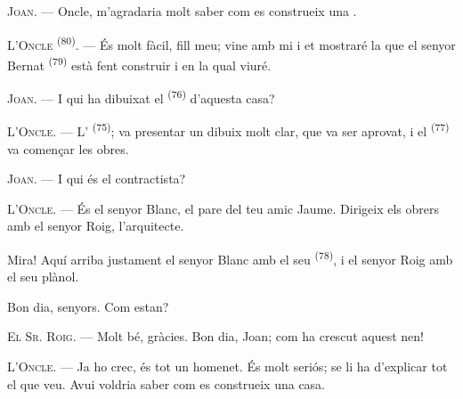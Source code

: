 %
%

\VUsaut{6.0mm}
\VUsaut{1.4mm}
\VUsaut{2.2mm}

\VUsaut{3.0mm}

\textsc{Joan}. --- Oncle, m'agradaria molt saber com es construeix una
.

\textsc{L'Oncle} \textsuperscript{(80)}. --- És molt fàcil, fill meu; vine amb mi i et
mostraré la que el senyor Bernat \textsuperscript{(79)} està fent construir i en la qual
viuré.

\textsc{Joan}. --- I qui ha dibuixat el  \textsuperscript{(76)} d'aquesta casa?

\textsc{L'Oncle}. --- L' \textsuperscript{(75)}; va presentar un dibuix
molt clar, que va ser aprovat, i el  \textsuperscript{(77)} va començar
les obres.

\textsc{Joan}. --- I qui és el contractista?

\textsc{L'Oncle}. --- És el senyor Blanc, el pare del teu amic Jaume. Dirigeix els obrers amb
el senyor Roig, l'arquitecte.

Mira! Aquí arriba justament el senyor Blanc amb el seu  \textsuperscript{(78)},
i el senyor Roig amb el seu plànol.

Bon dia, senyors. Com estan?

\textsc{El Sr. Roig}. --- Molt bé, gràcies. Bon dia, Joan; com ha crescut aquest nen!

\textsc{L'Oncle}. --- Ja ho crec, és tot un homenet. És molt seriós; se li ha d'explicar tot
el que veu. Avui voldria saber com es construeix una casa.

